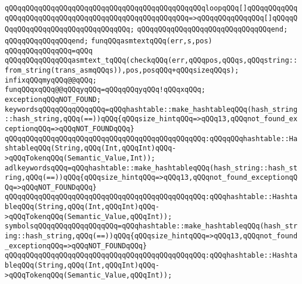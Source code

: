 \verb|qQQqqQQqqQQqqQQqqQQqqQQqqQQqqQQqqQQqqQQqqQQqqQQqloopqQQq[]qQQqqQQqqQQqqQQqqQQqqQQqqQQqqQQqqQQqqQQqqQQqqQQqqQQqqQQq=>qQQqqQQqqQQqqQQq[]qQQqqQQqqQQqqQQqqQQqqQQqqQQqqQQqqQQq;|\newline
\verb|qQQqqQQqqQQqqQQqqQQqqQQqqQQqqQQqend;|\newline
\verb|qQQqqQQqqQQqqQQqend;|\newline
\newline
\verb|funqQQqasmtextqQQq(err,s,pos)|\newline
\verb|qQQqqQQqqQQqqQQq=qQQq|\newline
\verb|qQQqqQQqqQQqqQQqasmtext_tqQQq(checkqQQq(err,qQQqpos,qQQqs,qQQqstring::from_string(trans_asmqQQqs)),pos,posqQQq+qQQqsizeqQQqs);|\newline
\newline
\verb|infixqQQqmyqQQq@@qQQq;|\newline
\newline
\verb|funqQQqxqQQq@@qQQqyqQQq=qQQqqQQqyqQQq!qQQqxqQQq;|\newline
\newline
\verb|exceptionqQQqNOT_FOUND;|\newline
\newline
\verb|keywordsqQQqqQQqqQQqqQQq=qQQqhashtable::make_hashtableqQQq(hash_string::hash_string,qQQq(==))qQQq{qQQqsize_hintqQQq=>qQQq13,qQQqnot_found_exceptionqQQq=>qQQqNOT_FOUNDqQQq}|\newline
\verb|qQQqqQQqqQQqqQQqqQQqqQQqqQQqqQQqqQQqqQQqqQQqqQQq:qQQqqQQqhashtable::HashtableqQQq(String,qQQq(Int,qQQqInt)qQQq->qQQqTokenqQQq(Semantic_Value,Int));|\newline
\newline
\verb|adlkeywordsqQQq=qQQqhashtable::make_hashtableqQQq(hash_string::hash_string,qQQq(==))qQQq{qQQqsize_hintqQQq=>qQQq13,qQQqnot_found_exceptionqQQq=>qQQqNOT_FOUNDqQQq}|\newline
\verb|qQQqqQQqqQQqqQQqqQQqqQQqqQQqqQQqqQQqqQQqqQQqqQQq:qQQqhashtable::HashtableqQQq(String,qQQq(Int,qQQqInt)qQQq->qQQqTokenqQQq(Semantic_Value,qQQqInt));|\newline
\newline
\verb|symbolsqQQqqQQqqQQqqQQqqQQq=qQQqhashtable::make_hashtableqQQq(hash_string::hash_string,qQQq(==))qQQq{qQQqsize_hintqQQq=>qQQq13,qQQqnot_found_exceptionqQQq=>qQQqNOT_FOUNDqQQq}|\newline
\verb|qQQqqQQqqQQqqQQqqQQqqQQqqQQqqQQqqQQqqQQqqQQqqQQq:qQQqhashtable::HashtableqQQq(String,qQQq(Int,qQQqInt)qQQq->qQQqTokenqQQq(Semantic_Value,qQQqInt));|\newline
